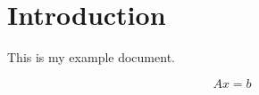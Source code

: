 \documentclass[12pt]{article}
\begin{document}
\section{Introduction}

This is my example document.

\begin{equation}
Ax=b
\end{equation}
\end{document}
